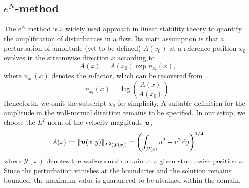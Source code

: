 \documentclass[../main.tex]{subfiles}
\begin{document}

\subsection{\texorpdfstring{$e^N$}{eN}-method}

The $e^N$ method is a widely used approach in linear stability theory to quantify the amplification of disturbances in a flow. Its main assumption is that a perturbation of amplitude (yet to be defined) $A(x_0)$ at a reference position $x_0$ evolves in the streamwise direction $x$ according to
\begin{equation}
	A(x) = A(x_0) \exp{n_{x_0}(x)},
	\label{eq:amplitudeEvolution}
\end{equation}
where $n_{x_0}(x)$ denotes the $n$-factor, which can be recovered from
\begin{equation}
	n_{x_0}(x) = \log\left( \frac{A(x)}{A(x_0)} \right).
	\label{eq:nfactorAmplitude}
\end{equation}
Henceforth, we omit the subscript $x_0$ for simplicity. A suitable definition for the amplitude in the wall-normal direction remains to be specified. In our setup, we choose the $L^2$ norm of the velocity magnitude $\bm{u}$,
\begin{equation}
	A(x) := \left\|\bm{u}(x,y)\right\|_{L^2(\mathcal{Y}(x))} = {\left( \int_{\mathcal{Y}(x)} u^2 + v^2 \dd{y}\right)}^{1/2}
	\label{eq:amplitudeNorm}
\end{equation}
where $\mathcal{Y}(x)$ denotes the wall-normal domain at a given streamwise position $x$. Since the perturbation vanishes at the boundaries and the solution remains bounded, the maximum value is guaranteed to be attained within the domain.
\end{document}
